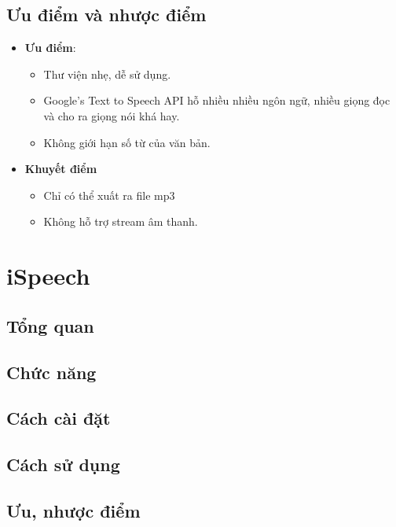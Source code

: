 \subsection{Ưu điểm và nhược điểm}
\begin{itemize}
\item \textbf{Ưu điểm}: 
	\begin{itemize}
	\item Thư viện nhẹ, dễ sử dụng.
	\item Google's Text to Speech API hỗ nhiều nhiều ngôn ngữ, nhiều giọng đọc và cho ra giọng nói khá hay.
	\item Không giới hạn số từ của văn bản.
	\end{itemize}  
\item \textbf{Khuyết điểm}
	\begin{itemize}
	\item Chỉ có thể xuất ra file mp3
	\item Không hỗ trợ stream âm thanh.
	\end{itemize}  
\end{itemize}

\section{iSpeech}
\subsection{Tổng quan}
\subsection{Chức năng}
\subsection{Cách cài đặt}
\subsection{Cách sử dụng}
\subsection{Ưu, nhược điểm}
